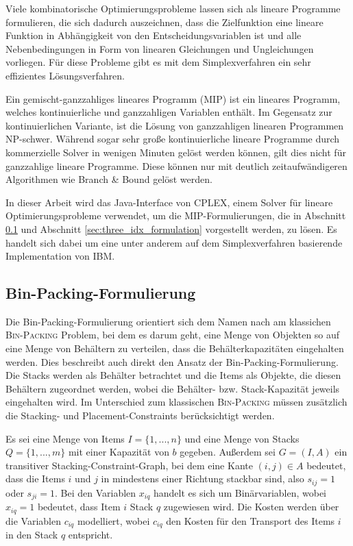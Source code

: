Viele kombinatorische Optimierungsprobleme lassen sich als lineare Programme formulieren, die sich dadurch
auszeichnen, dass die Zielfunktion eine lineare Funktion in Abhängigkeit von den Entscheidungsvariablen ist
und alle Nebenbedingungen in Form von linearen Gleichungen und Ungleichungen vorliegen. Für diese Probleme gibt es mit dem Simplexverfahren ein sehr effizientes Lösungsverfahren.\cite{Knust2017}

Ein gemischt-ganzzahliges lineares Programm (MIP) ist ein lineares Programm, welches kontinuierliche und ganzzahligen Variablen
enthält. Im Gegensatz zur kontinuierlichen Variante, ist die Lösung von ganzzahligen linearen Programmen NP-schwer.
Während sogar sehr große kontinuierliche lineare Programme durch kommerzielle Solver in wenigen Minuten gelöst werden können, gilt dies nicht für ganzzahlige lineare Programme. Diese können nur mit deutlich zeitaufwändigeren Algorithmen wie Branch \& Bound gelöst werden.\cite{Brucker2006}

In dieser Arbeit wird das Java-Interface von CPLEX, einem Solver für lineare Optimierungsprobleme verwendet,
um die MIP-Formulierungen, die in Abschnitt \ref{sec:bin_packing_formulation} und Abschnitt \ref{sec:three_idx_formulation} vorgestellt werden,
zu lösen. Es handelt sich dabei um eine unter anderem auf dem Simplexverfahren basierende Implementation von IBM. \cite{CPLEX2015}

\subsection{Bin-Packing-Formulierung}
\label{sec:bin_packing_formulation}

Die Bin-Packing-Formulierung orientiert sich dem Namen nach am klassichen \textsc{Bin-Packing} Problem, bei dem es darum geht,
eine Menge von Objekten so auf eine Menge von Behältern zu verteilen, dass die Behälterkapazitäten eingehalten werden.
Dies beschreibt auch direkt den Ansatz der Bin-Packing-Formulierung. Die Stacks werden als Behälter betrachtet und die Items als Objekte,
die diesen Behältern zugeordnet werden, wobei die Behälter- bzw. Stack-Kapazität jeweils eingehalten wird. Im Unterschied zum klassischen \textsc{Bin-Packing} müssen zusätzlich die Stacking- und Placement-Constraints berücksichtigt werden.

\pagebreak

Es sei eine Menge von Items $I = \{1, ..., n\}$ und eine Menge von Stacks $Q = \{1, ..., m\}$ mit einer Kapazität von $b$ gegeben.
Außerdem sei $G = (I, A)$ ein transitiver Stacking-Constraint-Graph, bei dem eine Kante $(i, j) \in A$ bedeutet,
dass die Items $i$ und $j$ in mindestens einer Richtung stackbar sind, also $s_{ij} = 1$ oder $s_{ji} = 1$.\newline
Bei den Variablen $x_{iq}$ handelt es sich um Binärvariablen, wobei $x_{iq} = 1$ bedeutet, dass Item $i$ Stack $q$ zugewiesen wird.
Die Kosten werden über die Variablen $c_{iq}$ modelliert, wobei $c_{iq}$ den Kosten für den Transport des Items $i$ in den Stack $q$
entspricht.

